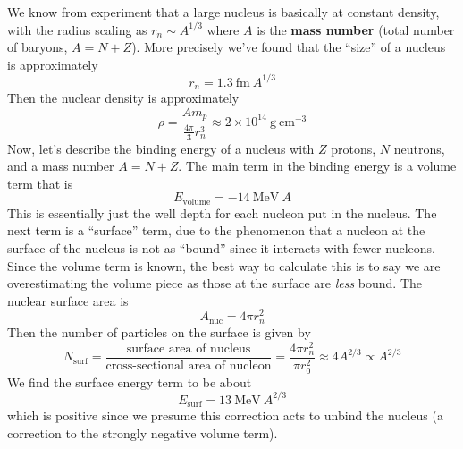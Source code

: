 \documentclass[10pt]{article}
\numberwithin{equation}{section}
\begin{document}
  We know from experiment that a large nucleus is basically at
  constant density, with the radius scaling as $r_n\sim A^{1/3}$ where
  $A$ is the \textbf{mass number} (total number of baryons,
  $A=N+Z$). More precisely we've found that the ``size'' of a nucleus
  is approximately
  \begin{equation}
    \label{eq:93}
    r_n=1.3\ \mathrm{fm}\ A^{1/3}
  \end{equation}
  Then the nuclear density is approximately
  \begin{equation}
    \label{eq:94}
    \rho=\frac{Am_p}{\frac{4\pi}{3}r_n^3}\approx2\times 10^{14}\
    \mathrm{g\  cm^{-3}} 
  \end{equation}
  Now, let's describe the binding energy of a nucleus with $Z$
  protons, $N$ neutrons, and a mass number $A=N+Z$. The main term in
  the binding energy is a volume term that is
  \begin{equation}
    \label{eq:95}
    E_{\mathrm{volume}}=-14\ \mathrm{MeV}\ A
  \end{equation}
  This is essentially just the well depth for each nucleon put in the
	nucleus. The next term is a ``surface'' term, due to the phenomenon that a
  nucleon at the surface of the nucleus is not as ``bound'' since it
  interacts with fewer nucleons. Since the volume term is known, the
  best way to calculate this is to say we are overestimating the
  volume piece as those at the surface are \emph{less} bound. The
  nuclear surface area is
  \begin{equation}
    \label{eq:367}
    A_{\mathrm{nuc}}=4\pi r_n^2
  \end{equation}
  Then the number of particles on the surface is given by
  \begin{equation}
    \label{eq:96}
    N_{\mathrm{surf}}=\frac{\textrm{surface area of
        nucleus}}{\textrm{cross-sectional area of nucleon}}=\frac{4\pi
      r_n^2}{\pi r_0^2}\approx 4A^{2/3}\propto A^{2/3}
  \end{equation}
  We find the surface energy term to be about
  \begin{equation}
    \label{eq:97}
    E_{\mathrm{surf}}=13\ \mathrm{MeV}\ A^{2/3}
  \end{equation}
  which is positive since we presume this correction acts to unbind
  the nucleus (a correction to the strongly negative volume term).\\
\end{document}
